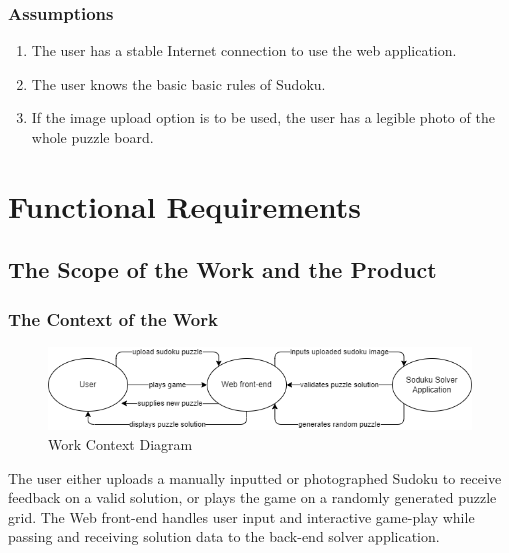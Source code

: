 \documentclass[11pt]{article}
\begin{document}
\subsubsection{Assumptions}

\begin{enumerate}
    \item The user has a stable Internet connection to use the web application.
    \item The user knows the basic basic rules of Sudoku.
    \item If the image upload option is to be used, the user has a legible photo of the whole puzzle board.
\end{enumerate}

\section{Functional Requirements}

\subsection{The Scope of the Work and the Product}

\subsubsection{The Context of the Work}
\begin{figure}[H]
    \centering
    \includegraphics[width=\textwidth]{sudoku_scope}
    \caption{Work Context Diagram}
    \label{fig:my_label}
\end{figure}

The user either uploads a manually inputted or photographed Sudoku to receive feedback on a valid solution, or plays the game on a randomly generated puzzle grid. The Web front-end handles user input and interactive game-play while passing and receiving solution data to the back-end solver application.

\newpage
\end{document}
